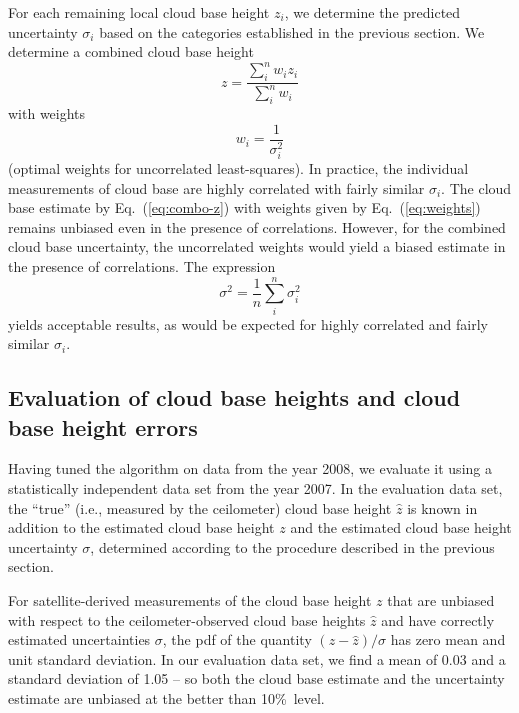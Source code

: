 \documentclass[amt,manuscript]{copernicus}\usepackage[]{graphicx}\usepackage[]{color}
\begin{document}
For each remaining local cloud base height $z_i$, we determine the predicted
uncertainty $\sigma_i$ based on the categories established in the previous
section.  We determine a combined cloud base height
\begin{equation}
  \label{eq:combo-z}
  z = \frac{\sum\limits_i^n w_i z_i}{\sum\limits_i^n w_i}
\end{equation}
with weights
\begin{equation}
  \label{eq:weights}
  w_i = \frac 1 {\sigma_i^2}
\end{equation}
(optimal weights for uncorrelated least-squares).  In practice, the individual
measurements of cloud base are highly correlated with fairly similar
$\sigma_i$.  The cloud base estimate by Eq.~(\ref{eq:combo-z}) with weights
given by Eq.~(\ref{eq:weights}) remains unbiased even in the presence of
correlations.  However, for the combined cloud base uncertainty,
the uncorrelated weights would yield a biased estimate in the presence of
correlations.  The expression
\begin{equation}
  \label{eq:combo-sigma}
  \sigma^2 = \frac 1 n \sum\limits_i^n \sigma_i^2
\end{equation}
yields acceptable results, as would be expected for highly correlated and fairly
similar $\sigma_i$.

\subsection{Evaluation of cloud base heights and cloud base height errors}
\label{sec:algorithm:eval}




Having tuned the algorithm on data from the year 2008, we evaluate it using a
statistically independent data set from the year 2007.  In the evaluation data
set, the ``true'' (i.e., measured by the ceilometer) cloud base height $\hat{z}$
is known in addition to the estimated cloud base height $z$ and the estimated
cloud base height uncertainty $\sigma$, determined according to the procedure
described in the previous section.

For satellite-derived measurements of the cloud base height $z$ that are
unbiased with respect to the ceilometer-observed cloud base heights $\hat{z}$
and have correctly estimated uncertainties $\sigma$, the pdf of the quantity
$(z - \hat{z})/\sigma$ has zero mean and unit standard deviation. In our
evaluation data set, we find a mean of 0.03 and a standard deviation of 1.05 -- so both the cloud base estimate and
the uncertainty estimate are unbiased at the better than 10\%\ level.
\end{document}
